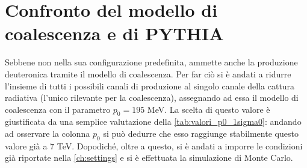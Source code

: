 \section{Confronto del modello di coalescenza e di PYTHIA}
Sebbene non nella sua configurazione predefinita, \pythiaa{} ammette anche la produzione deuteronica tramite il modello di coalescenza.
Per far ciò si è andati a ridurre l'insieme di tutti i possibili canali di produzione al singolo canale della cattura radiativa (l'unico rilevante per la coalescenza), assegnando ad essa il modello di coalescenza con il parametro $p_0 = 195$ MeV.
La scelta di questo valore è giustificata da una semplice valutazione della \autoref{tab:valori_p0_1sigma0}: andando ad osservare la colonna $p_0$ si può dedurre che esso raggiunge stabilmente questo valore già a 7 TeV.
Dopodiché, oltre a questo, si è andati a imporre le condizioni già riportate nella \autoref{ch:settings} e si è effettuata la simulazione di Monte Carlo.\\


